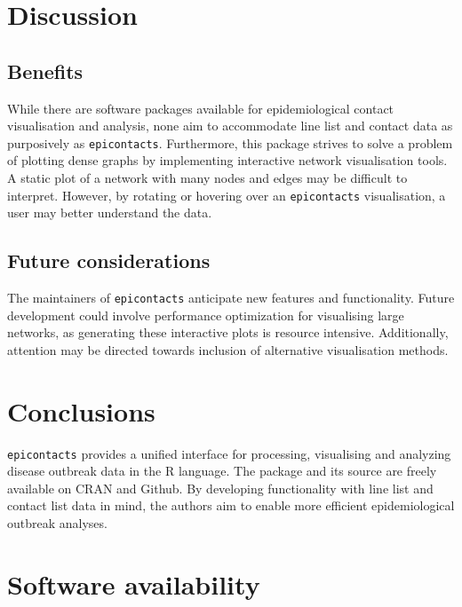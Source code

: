 \documentclass[9pt,a4paper,]{extarticle}
\theoremstyle{definition}
\theoremstyle{definition}
\theoremstyle{definition}
\theoremstyle{remark}
\begin{document}
\section{Discussion}\label{discussion}

\subsection{Benefits}\label{benefits}

While there are software packages available for epidemiological contact visualisation and analysis, none aim to accommodate line list and contact data as purposively as \texttt{epicontacts}\citep{noremark:2014}\citep{carroll:2014}\citep{guthrie:2017}. Furthermore, this package strives to solve a problem of plotting dense graphs by implementing interactive network visualisation tools. A static plot of a network with many nodes and edges may be difficult to interpret. However, by rotating or hovering over an \texttt{epicontacts} visualisation, a user may better understand the data.

\subsection{Future considerations}\label{future-considerations}

The maintainers of \texttt{epicontacts} anticipate new features and functionality. Future development could involve performance optimization for visualising large networks, as generating these interactive plots is resource intensive. Additionally, attention may be directed towards inclusion of alternative visualisation methods.

\section{Conclusions}\label{conclusions}

\texttt{epicontacts} provides a unified interface for processing, visualising and analyzing disease outbreak data in the R language. The package and its source are freely available on CRAN and Github. By developing functionality with line list and contact list data in mind, the authors aim to enable more efficient epidemiological outbreak analyses.

\section{Software availability}\label{software-availability}
\end{document}

